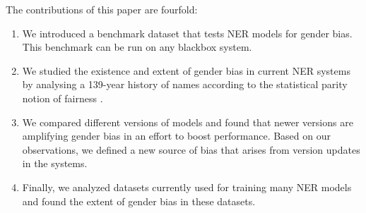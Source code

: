 The contributions of this paper are fourfold:
\begin{enumerate}
    \item We introduced a benchmark dataset
    that tests NER models for gender bias. This benchmark can be run on any blackbox system.
    \item We studied the existence and extent of gender bias in current NER systems by analysing a 139-year history of names according to the statistical parity notion of fairness \cite{NIPS2017_6995,Dwork:2012:FTA:2090236.2090255}.
    \item We compared different versions of models and found that newer versions are amplifying gender bias in an effort to boost performance. Based on our observations, we defined a new source of bias that arises from version updates in the systems. 
    \item Finally, we analyzed datasets currently used for training many NER models and found the extent of gender bias in these datasets.
\end{enumerate}
